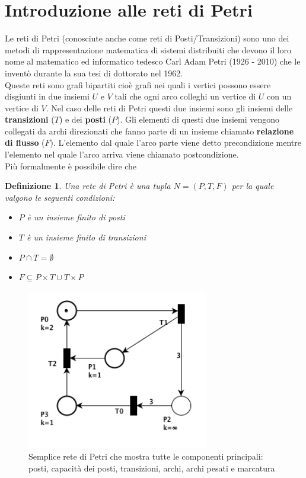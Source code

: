 \documentclass[italian,12pt]{book}
\newtheorem{mydef}{Definizione}
\begin{document}
\section{Introduzione alle reti di Petri}
Le reti di Petri (conosciute anche come reti di Posti/Transizioni)
sono uno dei metodi di rappresentazione matematica di sistemi
distribuiti che devono il loro nome al matematico ed informatico
tedesco Carl Adam Petri (1926 - 2010)  che le inventò durante la sua
tesi di dottorato nel 1962. \\
Queste reti sono grafi bipartiti cioè grafi nei
quali i vertici possono essere disgiunti in due insiemi $U$ e $V$ tali
che ogni arco colleghi un vertice di $U$ con un vertice di $V$. Nel
caso delle reti di Petri questi due insiemi sono gli insiemi delle
{\bf transizioni} ($T$) e dei {\bf posti} ($P$). Gli elementi di
questi due insiemi vengono collegati da archi direzionati che fanno
parte di un insieme chiamato {\bf relazione di flusso}
($F$). L'elemento dal quale l'arco parte viene detto precondizione
mentre l'elemento nel quale l'arco arriva viene chiamato
postcondizione. \\
Più formalmente è possibile dire che 
\begin{mydef}\label{def:pn1}
Una rete di Petri è una tupla $N = (P, T, F)$ per la quale valgono le
seguenti condizioni:
\begin{itemize}
\item $P$ è un insieme finito di posti
\item $T$ è un insieme finito di transizioni
\item $P \cap T = \emptyset $
\item $F \subseteq P \times T \cup T \times P $
\end{itemize}
\end{mydef}

\begin{figure}[htb]
\centerline{\includegraphics[height=7cm]{img/pnetbase.png}}
\caption{Semplice rete di Petri che mostra tutte le componenti
  principali: posti, capacità dei posti, transizioni, archi, archi
  pesati e marcatura}\label{fig:pnetbase.png}
\end{figure}
\end{document}
